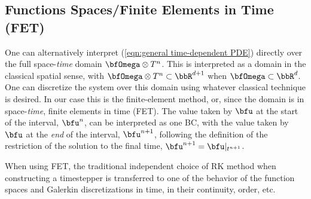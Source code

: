 \subsection{Functions Spaces/Finite Elements in Time (FET)}\label{cha:FET}
    One can alternatively interpret (\ref{eqn:general time-dependent PDE}) directly over the full space-\emph{time} domain $\bfOmega\otimes T^{n}$. This is interpreted as a domain in the classical spatial sense, with $\bfOmega\otimes T^{n}  \subset  \bbR^{d + 1}$ when $\bfOmega  \subset  \bbR^{d}$. One can discretize the system over this domain using whatever classical technique is desired. In our case this is the finite-element method, or, since the domain is in space-\emph{time}, finite elements in time (FET). The value taken by $\bfu$ at the start of the interval, $\bfu^{n}$, can be interpreted as one BC, with the value taken by $\bfu$ at the \emph{end} of the interval, $\bfu^{n + 1}$, following the definition of the restriction of the solution to the final time, $\bfu^{n + 1}  =  \bfu|_{t^{n + 1}}$.
    
    When using FET, the traditional independent choice of RK method when constructing a timestepper is transferred to one of the behavior of the function spaces and Galerkin discretizations in time, in their continuity, order, etc.
    
